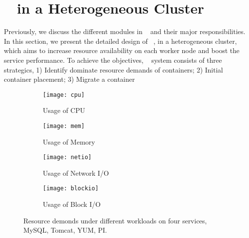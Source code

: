 \section{\sol~ in a Heterogeneous Cluster}
Previously, we discuss the different modules in \sol~ and their major responsibilities. 
In this section, we present the detailed design of \sol~, in a heterogeneous cluster, 
which aims to increase resource availability on each worker node and boost the service performance.
To achieve the objectives, \sol~ system consists of three strategics, 
1) Identify dominate resource demands of containers;
2) Initial container placement; 
3) Migrate a container



\begin{figure*}[ht]
   \centering
      \begin{subfigure}[t]{0.24\linewidth}
\centering
      \texttt{[image: cpu]}
      \vspace{-0.15in}
      \caption{Usage of CPU}
      \label{fig:cpu}
      \end{subfigure} %
      \begin{subfigure}[t]{0.24\linewidth}
\centering
      \texttt{[image: mem]}
      \vspace{-0.15in}
      \caption{Usage of Memory}
      \label{fig:mem}
      \end{subfigure} %
      \begin{subfigure}[t]{0.24\linewidth}
\centering
      \texttt{[image: netio]}
      \vspace{-0.15in}
      \caption{Usage of Network I/O}
      \label{fig:netio}
      \end{subfigure} %
      \begin{subfigure}[t]{0.24\linewidth}
\centering
      \texttt{[image: blockio]}
      \vspace{-0.15in}
      \caption{Usage of Block I/O}
      \label{fig:blockio}
      \end{subfigure} %
\caption{Resource demonds under different workloads on four services, MySQL, Tomcat, YUM, PI.}
\end{figure*}


